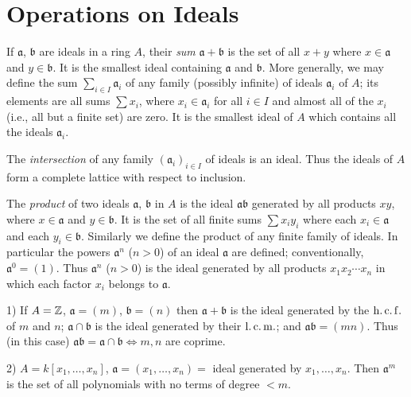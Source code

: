\section*{Operations on Ideals}

If $\mathfrak{a}$, $\mathfrak{b}$ are ideals in a ring $A$, their \emph{sum} $\mathfrak{a} + \mathfrak{b}$ is the set of all $x + y$ where $x \in \mathfrak{a}$ and $y \in \mathfrak{b}$. It is the smallest ideal containing $\mathfrak{a}$ and $\mathfrak{b}$. More generally, we may define the sum $\sum_{i \in I} \mathfrak{a}_i$ of any family (possibly infinite) of ideals $\mathfrak{a}_i$ of $A$; its elements are all sums $\sum x_i$, where $x_i \in \mathfrak{a}_i$ for all $i \in I$ and almost all of the $x_i$ (i.e., all but a finite set) are zero. It is the smallest ideal of $A$ which contains all the ideals $\mathfrak{a}_i$.

The \emph{intersection} of any family $(\mathfrak{a}_i)_{i \in I}$ of ideals is an ideal. Thus the ideals of $A$ form a complete lattice with respect to inclusion.

The \emph{product} of two ideals $\mathfrak{a}$, $\mathfrak{b}$ in $A$ is the ideal $\mathfrak{a}\mathfrak{b}$ generated by all products $xy$, where $x \in \mathfrak{a}$ and $y \in \mathfrak{b}$. It is the set of all finite sums $\sum x_i y_i$ where each $x_i \in \mathfrak{a}$ and each $y_i \in \mathfrak{b}$. Similarly we define the product of any finite family of ideals. In particular the powers $\mathfrak{a}^n$ ($n > 0$) of an ideal $\mathfrak{a}$ are defined; conventionally, $\mathfrak{a}^0 = (1)$. Thus $\mathfrak{a}^n$ ($n > 0$) is the ideal generated by all products $x_1 x_2 \cdots x_n$ in which each factor $x_i$ belongs to $\mathfrak{a}$.

\begin{examples}
1) If $A = \mathbb{Z}$, $\mathfrak{a} = (m)$, $\mathfrak{b} = (n)$ then $\mathfrak{a} + \mathfrak{b}$ is the ideal generated by the $\operatorname{h.c.f.}$ of $m$ and $n$; $\mathfrak{a} \cap \mathfrak{b}$ is the ideal generated by their $\operatorname{l.c.m.}$; and $\mathfrak{a}\mathfrak{b} = (mn)$. Thus (in this case) $\mathfrak{a}\mathfrak{b} = \mathfrak{a} \cap \mathfrak{b} \iff m, n$ are coprime.

2) $A = k[x_1, \ldots, x_n]$, $\mathfrak{a} = (x_1, \ldots, x_n) =$ ideal generated by $x_1, \ldots, x_n$. Then $\mathfrak{a}^m$ is the set of all polynomials with no terms of degree $< m$.
\end{examples}

